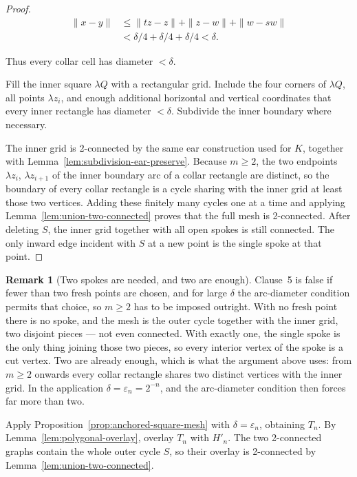\documentclass[11pt]{article}
\theoremstyle{mainplain}
\theoremstyle{mainroman}
\theoremstyle{definition}
\newtheorem{remark}[theorem]{Remark}
\numberwithin{equation}{section}
\begin{document}
\begin{proof}
\[
\begin{aligned}
\|x-y\|
 &\le
 \|tz-z\|+\|z-w\|+\|w-sw\|\\
 &<
 \delta/4+\delta/4+\delta/4
 <\delta.
\end{aligned}
\]

Thus every collar cell has diameter \(<\delta\).

Fill the inner square \(\lambda Q\) with a rectangular grid. Include the four corners of \(\lambda Q\), all points \(\lambda z_i\), and enough additional horizontal and vertical coordinates that every inner rectangle has diameter \(<\delta\). Subdivide the inner boundary where necessary.

The inner grid is 2-connected by the same ear construction used for \(K\), together with Lemma~\ref{lem:subdivision-ear-preserve}. Because \(m\ge2\), the two endpoints \(\lambda z_i\), \(\lambda z_{i+1}\) of the inner boundary arc of a collar rectangle are distinct, so the boundary of every collar rectangle is a cycle sharing with the inner grid at least those two vertices. Adding these finitely many cycles one at a time and applying Lemma~\ref{lem:union-two-connected} proves that the full mesh is 2-connected. After deleting \(S\), the inner grid together with all open spokes is still connected. The only inward edge incident with \(S\) at a new point is the single spoke at that point. \end{proof}

\begin{remark}[Two spokes are needed, and two are enough]\label{rem:mesh-two-spokes}
Clause~5 is false if fewer than two fresh points are chosen, and for
large \(\delta\) the arc-diameter condition permits that choice, so
\(m\ge2\) has to be imposed outright. With no fresh point there is no
spoke, and the mesh is the outer cycle together with the inner grid,
two disjoint pieces --- not even connected. With exactly one, the
single spoke is the only thing joining those two pieces, so every
interior vertex of the spoke is a cut vertex. Two are already enough,
which is what the argument above uses: from \(m\ge2\) onwards every
collar rectangle shares two distinct vertices with the inner grid. In
the application \(\delta=\varepsilon_n=2^{-n}\), and the arc-diameter
condition then forces far more than two.
\end{remark}

Apply Proposition~\ref{prop:anchored-square-mesh} with \(\delta=\varepsilon_n\), obtaining \(T_n\). By Lemma~\ref{lem:polygonal-overlay}, overlay \(T_n\) with \(H'_n\). The two 2-connected graphs contain the whole outer cycle \(S\), so their overlay is 2-connected by Lemma~\ref{lem:union-two-connected}.
\end{document}
